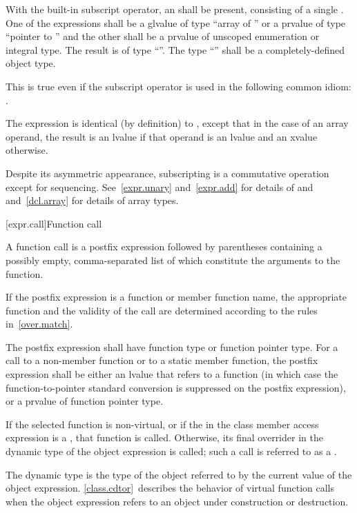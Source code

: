 \pnum
With the built-in subscript operator,
an  shall be present,
consisting of a single .
One of the expressions shall be a glvalue of type ``array of
'' or a prvalue of type ``pointer
to '' and the other shall be a prvalue of unscoped enumeration or integral type.
The result is of type ``''.
%
The type ``'' shall be a completely-defined object type.%
\begin{footnote}
This
is true even if the subscript operator is used in the following common idiom:
.
\end{footnote}
The expression  is identical (by definition) to
,
except that in the case of an array operand, the result is an lvalue
if that operand is an lvalue and an xvalue otherwise.

\pnum
\begin{note}
Despite its asymmetric appearance, subscripting is a commutative
operation except for sequencing.
See~\ref{expr.unary} and~\ref{expr.add} for details of \tcode{*} and
\tcode{+} and~\ref{dcl.array} for details of array types.
\end{note}

[expr.call]{Function call}

\pnum
{}%
%
%
A function call is a postfix expression followed by parentheses
containing a possibly empty, comma-separated list of
 which
constitute the arguments to the function.
\begin{note}
If the postfix expression is a function or member function name,
the appropriate function and the validity of the call
are determined according to the rules in~\ref{over.match}.
\end{note}
The postfix expression shall
have function type or function pointer type.
For a call to a non-member function or to a static member function,
the postfix expression shall be either an lvalue that refers to a
function (in which case the function-to-pointer standard
conversion is suppressed on the postfix expression),
or a prvalue of function pointer type.

\pnum
If the selected
function is non-virtual, or if the  in the class
member access expression is a , that function is
called. Otherwise, its final overrider in the dynamic type
of the object expression is called; such a call is referred to as a
.
\begin{note}
The dynamic type is the type of the object referred to by the
current value of the object expression. \ref{class.cdtor}~describes the
behavior of virtual function calls when the object expression
refers to
an object under construction or destruction.
\end{note}

